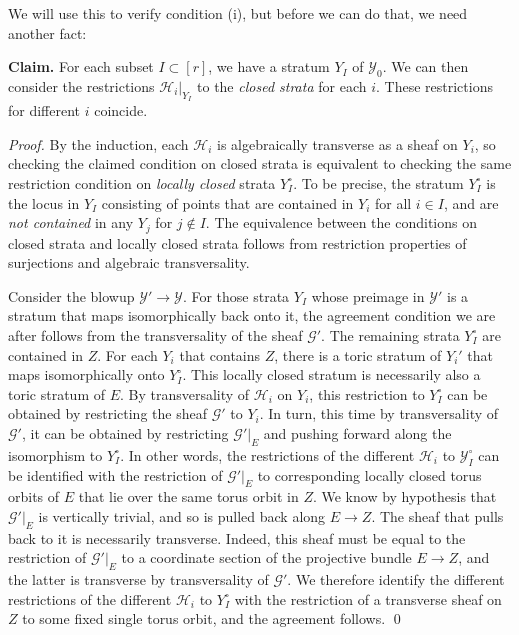 \documentclass[11pt]{amsart}
\theoremstyle{definition}
\theoremstyle{definition}
\newcommand{\cY}{\mathcal{Y}}
\newcommand{\cal}{\mathcal}
\def\cY{{\cal Y}}
\begin{document}
We will use this to verify condition (i), but before we can do that, we need another fact: 

\noindent
{\bf Claim.} For each subset $I\subset [r]$, we have a stratum $Y_I$ of $\cY_0$. We can then consider the restrictions $\mathcal H_i|_{Y_I}$ to the {\it closed strata} for each $i$. These restrictions for different $i$ coincide. 

\noindent
{\it Proof.} By the induction, each $\mathcal H_i$ is algebraically transverse as a sheaf on $Y_i$, so checking the claimed condition on closed strata is equivalent to checking the same restriction condition on {\it locally closed} strata $Y_I^\circ$. To be precise, the stratum $Y_I^\circ$ is the locus in $Y_I$ consisting of points that are contained in $Y_i$ for all $i\in I$, and are {\it not contained} in any $Y_j$ for $j\notin I$. The equivalence between the conditions on closed strata and locally closed strata follows from restriction properties of surjections and algebraic transversality. 

Consider the blowup $\mathcal Y'\to \mathcal Y$. For those strata $Y_I$ whose preimage in $\cY'$ is a stratum that maps isomorphically back onto it, the agreement condition we are after follows from the transversality of the sheaf $\mathcal G'$. The remaining strata $Y_I^\circ$ are contained in $Z$. For each $Y_i$ that contains $Z$, there is a toric stratum of $Y_i'$ that maps isomorphically onto $Y_I^\circ$. This locally closed stratum is necessarily also a toric stratum of $E$. By transversality of $\mathcal H_i$ on $Y_i$, this restriction to $Y_I^\circ$ can be obtained by restricting the sheaf $\mathcal G'$ to $Y_i$. In turn, this time by transversality of $\mathcal G'$, it can be obtained by restricting $\mathcal G'|_{E}$ and pushing forward along the isomorphism to $Y_I^\circ$. In other words, the restrictions of the different $\mathcal H_i$ to $\mathcal Y_I^\circ$ can be identified with the restriction of $\mathcal G'|_{E}$ to corresponding locally closed torus orbits of $E$ that lie over the same torus orbit in $Z$. We know by hypothesis that $\mathcal G'|_{E}$ is vertically trivial, and so is pulled back along $E\to Z$. The sheaf that pulls back to it is necessarily transverse. Indeed, this sheaf must be equal to the restriction of $\mathcal G'|_{E}$ to a coordinate section of the projective bundle $E\to Z$, and the latter is transverse by transversality of $\mathcal G'$. We therefore identify the different restrictions of the different $\mathcal H_i$ to $Y_I^\circ$ with the restriction of a transverse sheaf on $Z$ to some fixed single torus orbit, and the agreement follows. \qed
\end{document}
